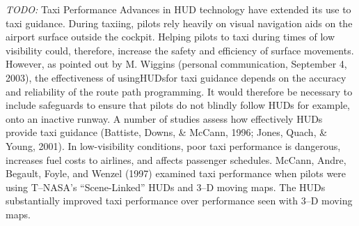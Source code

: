 \documentclass[utf8,bachelor,manualbib]{gradu3}
\begin{document}
\emph{TODO:}
Taxi Performance
Advances in HUD technology have extended its use to taxi guidance. During taxiing,
pilots rely heavily on visual navigation aids on the airport surface outside the
cockpit. Helping pilots to taxi during times of low visibility could, therefore, increase
the safety and efficiency of surface movements. However, as pointed out by
M. Wiggins (personal communication, September 4, 2003), the effectiveness of usingHUDsfor
taxi guidance depends on the accuracy and reliability of the route path
programming. It would therefore be necessary to include safeguards to ensure that
pilots do not blindly follow HUDs for example, onto an inactive runway.
A number of studies assess how effectively HUDs provide taxi guidance
(Battiste, Downs, \& McCann, 1996; Jones, Quach, \& Young, 2001). In
low-visibility conditions, poor taxi performance is dangerous, increases fuel costs
to airlines, and affects passenger schedules. McCann, Andre, Begault, Foyle, and
Wenzel (1997) examined taxi performance when pilots were using T–NASA’s
“Scene-Linked” HUDs and 3–D moving maps. The HUDs substantially improved
taxi performance over performance seen with 3–D moving maps. \citep{crawfordneal2006}
\end{document}
